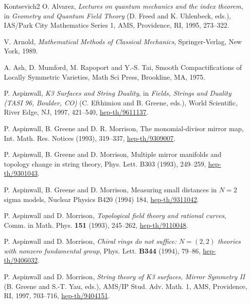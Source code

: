 \begin{thebibliography}{Kontsevich2}
\hypertarget{bib:Alvarez}{} O. Alvarez, \emph{Lectures on quantum mechanics and the index theorem}, in \emph{Geometry and Quantum Field Theory} (D. Freed and K. Uhlenbeck, eds.), IAS/Park City Mathematics Series 1, AMS, Providence, RI, 1995, 273--322.

\hypertarget{bib:Arnold}{} V. Arnold, \emph{Mathematical Methods of Classical Mechanics}, Springer-Verlag, New York, 1989.

\hypertarget{bib:AMRT}{}
A. Ash, D. Mumford, M. Rapoport and Y.-S. Tai, Smooth Compactifications of Locally Symmetric Varieties, Math Sci Press, Brookline, MA, 1975.

\hypertarget{bib:Aspinwall}{} P. Aspinwall, \emph{K3 Surfaces and String Duality}, in \emph{Fields, Strings and Duality (TASI 96, Boulder, CO)} (C. Efthimiou and B. Greene, eds.), World Scientific, River Edge, NJ, 1997, 421--540, \href{https://arxiv.org/abs/hep-th/9611137}{hep-th/9611137}.

\hypertarget{bib:AGM1}{}
P. Aspinwall, B. Greene and D. R. Morrison,
The monomial-divisor mirror map,
Int. Math. Res. Notices (1993), 319--337, \href{https://arxiv.org/abs/hep-th/9309007}{hep-th/9309007}.

\hypertarget{bib:AGM2}{}
P. Aspinwall, B. Greene and D. Morrison, Multiple mirror manifolds and topology
change in string theory, Phys. Lett. B303 (1993), 249--259, \href{https://arxiv.org/abs/hep-th/9301043}{hep-th/9301043}.

\hypertarget{bib:AGM3}{}
P. Aspinwall, B. Greene and D. Morrison, Measuring small distances in $N=2$ sigma models, Nuclear Physics B420 (1994) 184, \href{https://arxiv.org/abs/hep-th/9311042}{hep-th/9311042}.


\hypertarget{bib:AM1}{} P. Aspinwall and D. Morrison, \emph{Topological field theory and rational curves}, Comm. in Math. Phys. \textbf{151} (1993), 245--262, \href{https://arxiv.org/abs/hep-th/9110048}{hep-th/9110048}.

\hypertarget{bib:AM2}{} P. Aspinwall and D. Morrison, \emph{Chiral rings do not suffice: $N=(2,2)$ theories with nonzero fundamental group}, Phys. Lett. \textbf{B344} (1994), 79--86, \href{https://arxiv.org/abs/hep-th/9406032}{hep-th/9406032}.

\hypertarget{bib:AM3}{} P. Aspinwall and D. Morrison, \emph{String theory of K3 surfaces}, \emph{Mirror Symmetry II} (B. Greene and S.-T. Yau, eds.), AMS/IP Stud. Adv. Math. 1, AMS, Providence, RI, 1997, 703--716, \href{https://arxiv.org/abs/hep-th/9404151}{hep-th/9404151}.


\end{thebibliography}
